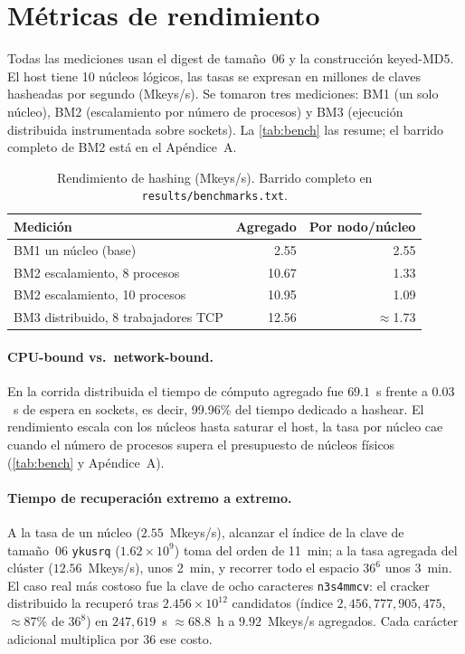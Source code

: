 \section{Métricas de rendimiento}\label{sec:bench}
Todas las mediciones usan el digest de tamaño~06 y la construcción keyed-MD5. El host tiene 10 núcleos lógicos, las tasas se expresan en millones de claves hasheadas por segundo (Mkeys/s). Se tomaron tres mediciones: BM1 (un solo núcleo), BM2 (escalamiento por número de procesos) y BM3 (ejecución distribuida instrumentada sobre sockets). La \autoref{tab:bench} las resume; el barrido completo de BM2 está en el Apéndice~A.

\begin{table}[H]
\centering
\footnotesize
\begin{tabularx}{\linewidth}{X r r}
\hline
\textbf{Medición} & \textbf{Agregado} & \textbf{Por nodo/núcleo}\\
\hline
BM1 un núcleo (base)                 & 2.55 & 2.55\\
BM2 escalamiento, 8 procesos         & 10.67 & 1.33\\
BM2 escalamiento, 10 procesos        & 10.95 & 1.09\\
BM3 distribuido, 8 trabajadores TCP  & 12.56 & $\approx$1.73\\
\hline
\end{tabularx}
\caption{Rendimiento de hashing (Mkeys/s). Barrido completo en \texttt{results/benchmarks.txt}.}
\label{tab:bench}
\end{table}

\paragraph{CPU-bound vs.\ network-bound.} En la corrida distribuida el tiempo de cómputo agregado fue $69.1$~s frente a $0.03$~s de espera en sockets, es decir, 99.96\% del tiempo dedicado a hashear. El rendimiento escala con los núcleos hasta saturar el host, la tasa por núcleo cae cuando el número de procesos supera el presupuesto de núcleos físicos (\autoref{tab:bench} y Apéndice~A).

\paragraph{Tiempo de recuperación extremo a extremo.} A la tasa de un núcleo ($2.55$~Mkeys/s), alcanzar el índice de la clave de tamaño~06 \texttt{ykusrq} ($1.62\times10^9$) toma del orden de 11~min; a la tasa agregada del clúster ($12.56$~Mkeys/s), unos 2~min, y recorrer todo el espacio $36^6$ unos 3~min. El caso real más costoso fue la clave de ocho caracteres \texttt{n3s4mmcv}: el cracker distribuido la recuperó tras $2.456\times10^{12}$ candidatos (índice $2{,}456{,}777{,}905{,}475$, $\approx$87\% de $36^8$) en $247{,}619$~s $\approx 68.8$~h a $9.92$~Mkeys/s agregados. Cada carácter adicional multiplica por 36 ese costo.

